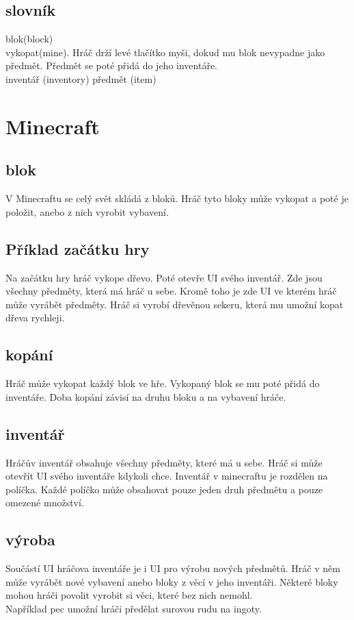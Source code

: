 \documentclass[FM,RP]{tulthesis}
\begin{document}

\section{slovník}
blok(block) \\
vykopat(mine). Hráč drží levé tlačítko myši, dokud mu blok nevypadne jako předmět. Předmět se poté přidá do jeho inventáře.\\
inventář (inventory) 
předmět (item)


\chapter{Minecraft}
\section{blok}
V Minecraftu se celý svět skládá z bloků. Hráč tyto bloky může vykopat a poté je položit, anebo z nich vyrobit vybavení.
\section{Příklad začátku hry}
Na začátku hry hráč vykope dřevo. Poté otevře UI svého inventář. Zde jsou všechny předměty, která má hráč u sebe. Kromě toho je zde UI ve kterém hráč může vyrábět předměty. Hráč si vyrobí dřevěnou sekeru, která mu umožní kopat dřeva rychleji.
\section{kopání}
Hráč může vykopat každý blok ve hře. Vykopaný blok se mu poté přidá do inventáře. Doba kopání závisí na druhu bloku a na vybavení hráče.
\section{inventář}
Hráčův inventář obsahuje všechny předměty, které má u sebe. Hráč si může otevřít UI svého inventáře kdykoli chce. Inventář v minecraftu je rozdělen na políčka. Každé políčko může obsahovat pouze jeden druh předmětu a pouze omezené množství.
\section{výroba}
Součástí UI hráčova inventáře je i UI pro výrobu nových předmětů. Hráč v něm může vyrábět nové vybavení anebo bloky z věcí v jeho inventáři. Některé bloky mohou hráči povolit vyrobit si věci, které bez nich nemohl.\\ Například pec umožní hráči předělat surovou rudu na ingoty.  
\end{document}
